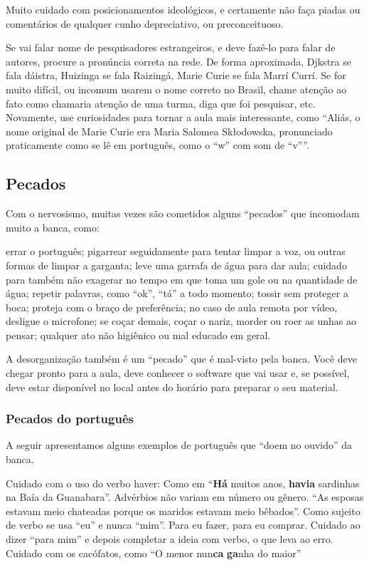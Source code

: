 \documentclass{article}
\begin{document}
Muito cuidado com posicionamentos ideológicos, e certamente não faça piadas ou comentários de qualquer cunho depreciativo, ou preconceituoso. 


Se vai falar nome de pesquisadores estrangeiros, e deve fazê-lo para falar de autores, procure a pronúncia correta na rede. De forma aproximada, Djkstra se fala dáistra, Huizinga se fala Raizingá, Marie Curie se fala Marrí Currí. Se for muito difícil, ou incomum usarem o nome correto no Brasil, chame atenção ao fato como chamaria atenção de uma turma, diga que foi pesquisar, etc. Novamente, use curiosidades para tornar a aula mais interessante, como ``Aliás, o nome original de Marie Curie era Maria Salomea Sk\l odowska, pronunciado praticamente como se lê em português, como o ``w'' com som de ``v''''.

\subsection{Pecados}

Com o nervosismo, muitas vezes são cometidos alguns ``pecados'' que incomodam muito a banca, como:
\begin{outline}
\1 errar o português;
\1 pigarrear seguidamente para tentar limpar a voz, ou outras formas de limpar a garganta;
\2 leve uma garrafa de água para dar aula;
\3 cuidado para também não exagerar no tempo em que toma um gole ou na quantidade de água;
\1 repetir palavras, como ``ok'', ``tá'' a todo momento;
\1 tossir sem proteger a boca;
\2 proteja com o braço de preferência;
\2 no caso de aula remota por vídeo, desligue o microfone;
\1 se coçar demais, coçar o nariz, morder ou roer as unhas ao pensar;
\1 qualquer ato não higiênico ou mal educado em geral.
\end{outline}

A desorganização também é um ``pecado'' que é mal-visto pela banca. Você deve chegar pronto para a aula, deve conhecer o software que vai usar e, se possível, deve estar disponível no local antes do horário para preparar o seu material.





\subsubsection{Pecados do português}

A seguir apresentamos alguns exemplos de português que ``doem no ouvido'' da banca.
\begin{outline}
\1 Cuidado com o uso do verbo haver:
\2 Como em ``\textbf{Há} muitos anos, \textbf{havia} sardinhas na Baía da Guanabara''.
\1 Advérbios não variam em número ou gênero.
\2 ``As esposas estavam meio chateadas porque os maridos estavam meio bêbados''.
\1 Como sujeito de verbo se usa ``eu'' e nunca ``mim''. Para eu fazer, para eu comprar. Cuidado ao dizer ``para mim'' e depois  completar a ideia com verbo, o que leva ao erro.
\1 Cuidado com os cacófatos, como ``O menor nun\textbf{ca} \textbf{ga}nha do maior''
\end{outline}
\end{document}
